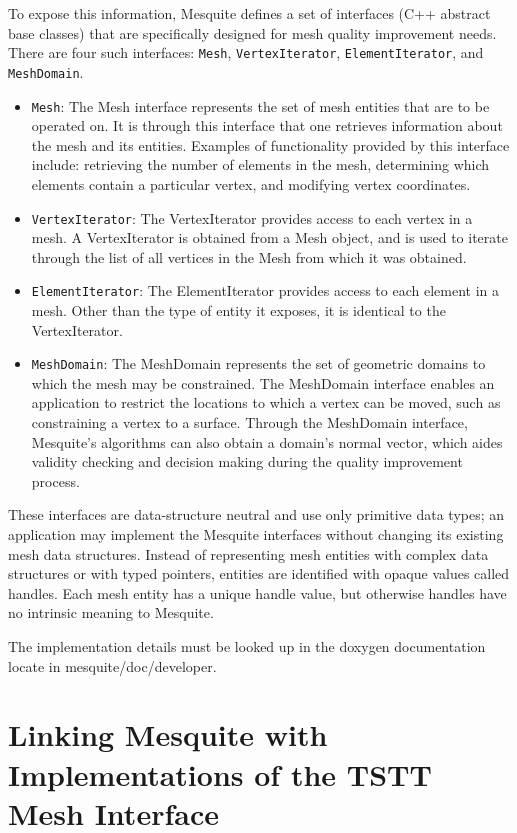 \documentclass[letter]{report}
\begin{document}
To expose this information, Mesquite defines a set of interfaces 
(C++ abstract base classes) that are specifically designed for mesh
quality improvement needs.  There are four such interfaces: \texttt{Mesh},
\texttt{VertexIterator}, \texttt{ElementIterator}, and \texttt{MeshDomain}.
\begin{itemize}
\item \texttt{Mesh}: The Mesh interface represents the set of mesh
entities that are to be operated on.  It is through this interface
that one retrieves information about the mesh and its entities.
Examples of functionality provided by this interface include:
retrieving the number of elements in the mesh, determining which
elements contain a particular vertex, and modifying vertex
coordinates.
\item \texttt{VertexIterator}: The VertexIterator provides access to each
vertex in a mesh.  A VertexIterator is obtained from a Mesh object,
and is used to iterate through the list of all vertices in the Mesh
from which it was obtained.
\item \texttt{ElementIterator}: The ElementIterator provides access to
each element in a mesh.  Other than the type of entity it exposes, it
is identical to the VertexIterator.
\item \texttt{MeshDomain}: The MeshDomain represents the set of geometric
domains to which the mesh may be constrained.  The MeshDomain
interface enables an application to restrict the locations to which a
vertex can be moved, such as constraining a vertex to a surface.
Through the MeshDomain interface, Mesquite's algorithms can also
obtain a domain's normal vector, which aides validity checking and 
decision making during the quality improvement process.
\end{itemize}
These interfaces are data-structure neutral and use only primitive
data types; an application may implement the Mesquite interfaces
without changing its existing mesh data structures.  Instead of
representing mesh entities with complex data structures or with typed
pointers, entities are identified with opaque values called handles.
Each mesh entity has a unique handle value, but otherwise handles have
no intrinsic meaning to Mesquite.  

The implementation details must be looked up in the doxygen documentation locate in mesquite/doc/developer.

\section{Linking Mesquite with Implementations of the TSTT Mesh Interface} 
\label{sec:TSTT}
\end{document}
